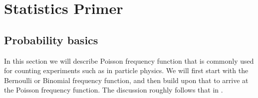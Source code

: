 \chapter{Statistics Primer}
\section{Probability basics}

In this section we will describe Poisson frequency function that is commonly used for counting experiments such as in particle physics. We will first start with the Bernoulli or Binomial frequency function, and then build upon that to arrive at the Poisson frequency function. The discussion roughly follows that in \citep{Melissinos}.
